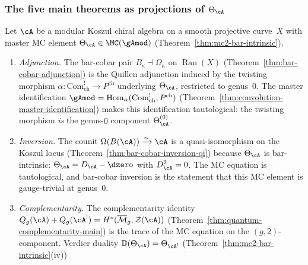 
\subsubsection{The five main theorems as projections of
$\Theta_\cA$}

\begin{theorem}
\label{thm:five-from-theta}
\ClaimStatusProvedHere
{}
Let $\cA$ be a modular Koszul chiral algebra on a smooth
projective curve~$X$ with master MC element
$\Theta_\cA \in \MC(\gAmod)$
\textup{(}Theorem~\textup{\ref{thm:mc2-bar-intrinsic}}\textup{)}.
\begin{enumerate}[label=\textup{(\Alph*)}]
\item \emph{Adjunction.}
  The bar-cobar pair
  $B_\kappa \dashv \Omega_\kappa$ on
  $\operatorname{Ran}(X)$
  \textup{(}Theorem~\textup{\ref{thm:bar-cobar-adjunction}}\textup{)}
  is the Quillen adjunction induced by the twisting morphism
  $\alpha \colon \mathrm{Com}^!_{\mathrm{ch}} \to P^{\mathrm{ch}}$
  underlying $\Theta_\cA$, restricted to genus~$0$.
  The master identification
  $\gAmod = \operatorname{Hom}_\alpha(\mathrm{Com}^!_{\mathrm{ch}},
  P^{\mathrm{ch}})$
  \textup{(}Theorem~\textup{\ref{thm:convolution-master-identification}}\textup{)}
  makes this identification tautological:
  the twisting morphism \emph{is} the genus-$0$ component
  $\Theta_\cA^{(0)}$.
\item \emph{Inversion.}
  The counit $\Omega(B(\cA)) \xrightarrow{\sim} \cA$ is
  a quasi-isomorphism on the Koszul locus
  \textup{(}Theorem~\textup{\ref{thm:bar-cobar-inversion-qi}}\textup{)}
  because $\Theta_\cA$ is bar-intrinsic:
  $\Theta_\cA = D_\cA - \dzero$ with $D_\cA^2 = 0$.
  The MC equation is tautological, and
  bar-cobar inversion is the statement that this MC element is
  gauge-trivial at genus~$0$.
\item \emph{Complementarity.}
  The complementarity identity
  $Q_g(\cA) + Q_g(\cA^!) = H^*(\overline{\mathcal{M}}_g,
  \mathcal{Z}(\cA))$
  \textup{(}Theorem~\textup{\ref{thm:quantum-complementarity-main}}\textup{)}
  is the trace of the MC equation on the
  $(g,2)$-component.  Verdier duality
  $\mathbb{D}(\Theta_\cA) = \Theta_{\cA^!}$
  \textup{(}Theorem~\textup{\ref{thm:mc2-bar-intrinsic}}\textup{(iv)}\textup{)}

\end{enumerate}
\end{theorem}
